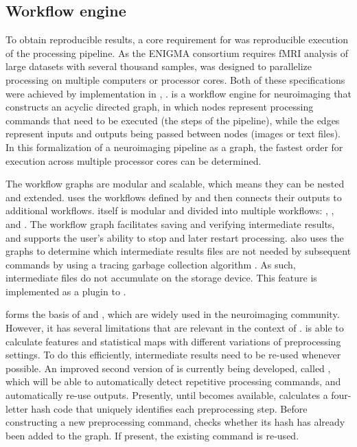 \subsection{Workflow engine}

To obtain reproducible results, a core requirement for  was
reproducible execution of the processing pipeline. As the ENIGMA consortium
requires fMRI analysis of large datasets with several thousand samples,
 was designed to parallelize processing on multiple
computers or processor cores. Both of these specifications were achieved by
implementation in ,  \citep{10.3389/fninf.2011.00013}.  is a
workflow engine for neuroimaging that constructs an acyclic directed graph,
in which nodes represent processing commands that need to be executed (the
steps of the pipeline), while the edges represent inputs and outputs being
passed between nodes (images or text files). In this formalization of a
neuroimaging pipeline as a graph, the fastest order for execution across
multiple processor cores can be determined.

The workflow graphs are modular and scalable, which means they can be
nested and extended.  uses the workflows defined by
 and then connects their outputs to additional workflows.
 itself is modular and divided into multiple workflows:
 \citep{esteban_oscar_2021_4593442}, , and
. The workflow graph facilitates saving and verifying
intermediate results, and supports the user's ability to stop and later
restart processing.  also uses the graphs to determine which
intermediate results files are not needed by subsequent commands by using a
tracing garbage collection algorithm \citep{10.1145/359642.359655}. As
such, intermediate files do not accumulate on the storage device. This
feature is implemented as a plugin to .

 forms the basis of  and , which
are widely used in the neuroimaging community. However, it has several
limitations that are relevant in the context of .
 is able to calculate features and statistical maps with
different variations of preprocessing settings. To do this efficiently,
intermediate results need to be re-used whenever possible. An improved
second version of  is currently being developed, called
 \citep{pydra-proc-scipy-2020}, which will be able to
automatically detect repetitive processing commands, and automatically
re-use outputs. Presently, until  becomes available,
 calculates a four-letter hash code that uniquely identifies
each preprocessing step. Before constructing a new preprocessing command,
 checks whether its hash has already been added to the
graph. If present, the existing command is re-used.

